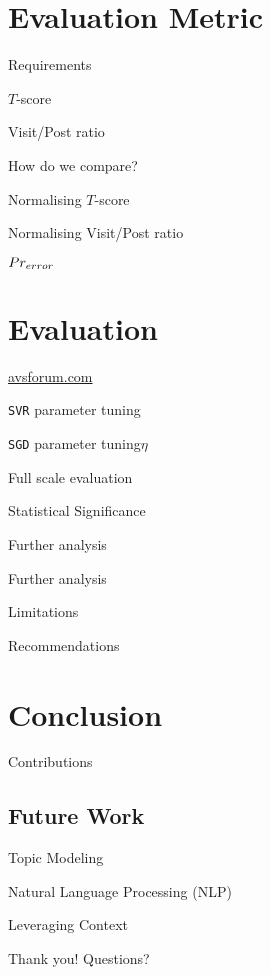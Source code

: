 \documentclass[12pt]{../presentation}
\begin{document}
\section{Evaluation Metric}
	\begin{frame}{Requirements}\end{frame}
	\begin{frame}{$T$-score}\end{frame}
	\begin{frame}{Visit/Post ratio}\end{frame}
	\begin{frame}{How do we compare?}\end{frame}
	\begin{frame}{Normalising $T$-score}\end{frame}
	\begin{frame}{Normalising Visit/Post ratio}\end{frame}
	\begin{frame}{$Pr_{error}$}\end{frame}

\section{Evaluation}
	\begin{frame}{\url{avsforum.com}}\end{frame}
	\begin{frame}{\texttt{SVR} parameter tuning}\end{frame}
	\begin{frame}{\texttt{SGD} parameter tuning}$\eta$\end{frame}
	\begin{frame}{Full scale evaluation}\end{frame}
	\begin{frame}{Statistical Significance}\end{frame}
	\begin{frame}{Further analysis}\end{frame}
	\begin{frame}{Further analysis}\end{frame}
	\begin{frame}{Limitations}\end{frame}
	\begin{frame}{Recommendations}\end{frame}

\section{Conclusion}
	\begin{frame}{Contributions}\end{frame}
	\subsection{Future Work}
	\begin{frame}{Topic Modeling}\end{frame}
	\begin{frame}{Natural Language Processing (NLP)}\end{frame}
	\begin{frame}{Leveraging Context}\end{frame}

\begin{frame}
\begin{center}
	\huge
	Thank you! Questions?
\end{center}
\end{frame}
\end{document}
